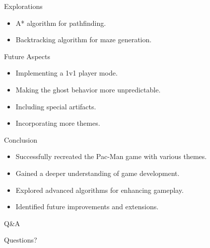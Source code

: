 \documentclass{beamer}
\begin{document}
\begin{frame}{Explorations}
    \begin{itemize}
        \item A* algorithm for pathfinding.
        \item Backtracking algorithm for maze generation.
    \end{itemize}
\end{frame}

\begin{frame}{Future Aspects}
    \begin{itemize}
        \item Implementing a 1v1 player mode.
        \item Making the ghost behavior more unpredictable.
        \item Including special artifacts.
        \item Incorporating more themes.
    \end{itemize}
\end{frame}

\begin{frame}{Conclusion}
    \begin{itemize}
        \item Successfully recreated the Pac-Man game with various themes.
        \item Gained a deeper understanding of game development.
        \item Explored advanced algorithms for enhancing gameplay.
        \item Identified future improvements and extensions.
    \end{itemize}
\end{frame}

\begin{frame}{Q\&A}
    \begin{center}
        \Huge{Questions?}
    \end{center}
\end{frame}
\end{document}
